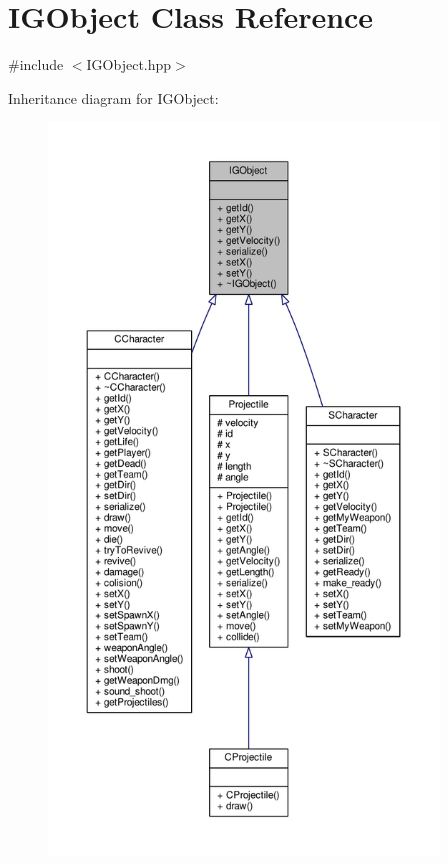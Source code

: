 \hypertarget{class_i_g_object}{}\section{I\+G\+Object Class Reference}
\label{class_i_g_object}


{\ttfamily \#include $<$I\+G\+Object.\+hpp$>$}



Inheritance diagram for I\+G\+Object\+:\nopagebreak
\begin{figure}[H]
\begin{center}
\leavevmode
\includegraphics[height=550pt]{class_i_g_object__inherit__graph}
\end{center}
\end{figure}


